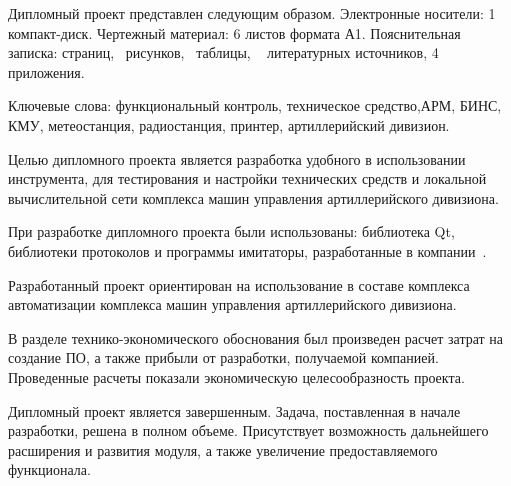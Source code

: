 \thispagestyle{empty}

Дипломный проект представлен следующим образом. Электронные
носители: 1 компакт-диск. Чертежный материал: 6 листов формата А1.
Пояснительная записка: \pageref*{LastPage} страниц, \totfig{}~рисунков, \tottab{}~таблицы, \totref{}~
литературных источников, 4 приложения.

Ключевые слова: функциональный контроль, техническое средство,\break АРМ, БИНС, КМУ, метеостанция, радиостанция, принтер, артиллерийский дивизион.

Целью дипломного проекта является разработка удобного в использовании инструмента, для тестирования и настройки
технических средств и локальной вычислительной сети комплекса машин управления артиллерийского дивизиона.

При разработке дипломного проекта были использованы: библиотека Qt, библиотеки протоколов и программы имитаторы, разработанные в
компании~\company.

Разработанный проект ориентирован на использование в составе комплекса автоматизации комплекса машин управления
артиллерийского дивизиона.

В разделе технико-экономического обоснования был произведен расчет затрат на создание ПО, а также прибыли от разработки,
получаемой компанией.
Проведенные расчеты показали экономическую целесообразность проекта.

Дипломный проект является завершенным. Задача, поставленная в
начале разработки, решена в полном объеме. Присутствует возможность
дальнейшего расширения и развития модуля, а также увеличение
предоставляемого функционала.

\clearpage
